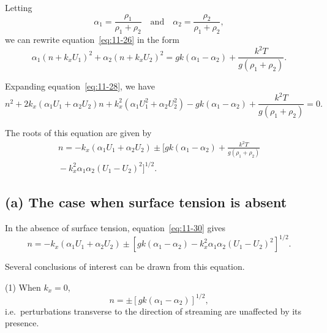 Letting
\begin{equation}
\label{eq:11-27}
\alpha_1 = \frac{\rho_1}{\rho_1+\rho_2} \quad\text{and}\quad \alpha_2 = \frac{\rho_2}{\rho_1+\rho_2},
\end{equation}
we can rewrite equation~\eqref{eq:11-26} in the form
\begin{equation}
\label{eq:11-28}
\alpha_1(n+k_x U_1)^2+\alpha_2(n+k_x U_2)^2 = gk\!\left(\alpha_1-\alpha_2\right)+\frac{k^2 T}{g(\rho_1+\rho_2)}.
\end{equation}

Expanding equation~\eqref{eq:11-28}, we have
\begin{equation}
\label{eq:11-29}
n^2+2k_x(\alpha_1 U_1+\alpha_2 U_2)n+k_x^2(\alpha_1 U_1^2+\alpha_2 U_2^2) - gk\!\left(\alpha_1-\alpha_2\right)+\frac{k^2T}{g(\rho_1+\rho_2)} = 0.
\end{equation}

The roots of this equation are given by
\begin{multline}
\label{eq:11-30}
n = -k_x(\alpha_1 U_1+\alpha_2 U_2) \pm \bigg[gk\!\left(\alpha_1-\alpha_2\right)+\frac{k^2 T}{g(\rho_1+\rho_2)} \\
{}-k_x^2\alpha_1\alpha_2(U_1-U_2)^2\bigg]^{1/2}\!.
\end{multline}

\subsection*{(a) The case when surface tension is absent}

In the absence of surface tension, equation~\eqref{eq:11-30} gives
\begin{equation}
\label{eq:11-31}
n = -k_x(\alpha_1 U_1+\alpha_2 U_2)\pm\!\left[gk(\alpha_1-\alpha_2)-k_x^2\alpha_1\alpha_2(U_1-U_2)^2\right]^{1/2}\!.
\end{equation}

Several conclusions of interest can be drawn from this equation.

(1) When $k_x = 0$,
\begin{equation}
\label{eq:11-32}
n = \pm\left[gk(\alpha_1-\alpha_2)\right]^{1/2},
\end{equation}
i.e.\ perturbations transverse to the direction of streaming are unaffected by its presence.

